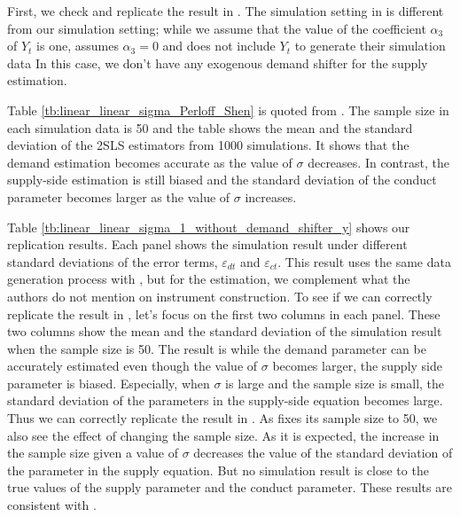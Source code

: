 \documentclass[11pt, a4paper]{article}
\begin{document}
First, we check and replicate the result in \citet{perloff2012collinearity}.
The simulation setting in \cite{perloff2012collinearity} is different from our simulation setting; while we assume that the value of the coefficient $\alpha_3$ of $Y_t$ is one, \cite{perloff2012collinearity} assumes $\alpha_3 = 0$ and does not include $Y_t$ to generate their simulation data
In this case, we don't have any exogenous demand shifter for the supply estimation.

Table \ref{tb:linear_linear_sigma_Perloff_Shen} is quoted from \cite{perloff2012collinearity}.
The sample size in each simulation data is 50 and the table shows the mean and the standard deviation of the 2SLS estimators from 1000 simulations.
It shows that the demand estimation becomes accurate as the value of $\sigma$ decreases.
In contrast, the supply-side estimation is still biased and the standard deviation of the conduct parameter becomes larger as the value of $\sigma$ increases.

Table \ref{tb:linear_linear_sigma_1_without_demand_shifter_y} shows our replication results.
Each panel shows the simulation result under different standard deviations of the error terms, $\varepsilon_{dt}$ and $\varepsilon_{ct}$.
This result uses the same data generation process with \citet{perloff2012collinearity}, but for the estimation, we complement what the authors do not mention on instrument construction.
To see if we can correctly replicate the result in \cite{perloff2012collinearity}, let's focus on the first two columns in each panel.
These two columns show the mean and the standard deviation of the simulation result when the sample size is 50.
The result is while the demand parameter can be accurately estimated even though the value of $\sigma$ becomes larger, the supply side parameter is biased.
Especially, when $\sigma$ is large and the sample size is small, the standard deviation of the parameters in the supply-side equation becomes large.
Thus we can correctly replicate the result in \citet{perloff2012collinearity}.
As \cite{perloff2012collinearity} fixes its sample size to 50, we also see the effect of changing the sample size.
As it is expected, the increase in the sample size given a value of $\sigma$ decreases the value of the standard deviation of the parameter in the supply equation.
But no simulation result is close to the true values of the supply parameter and the conduct parameter.
These results are consistent with \cite{perloff2012collinearity}.
\end{document}
